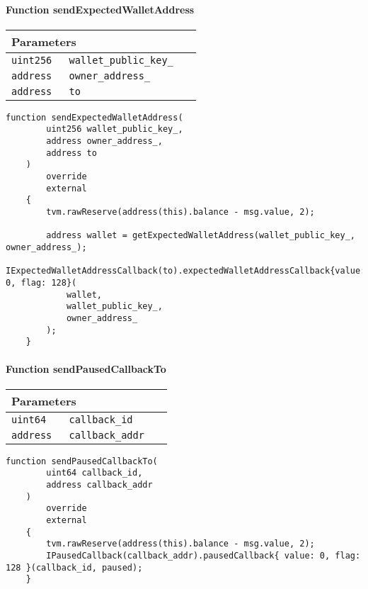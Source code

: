 \paragraph{Function sendExpectedWalletAddress}


\ifsoltables
\noindent\begin{tabular}{|l|l|p{5cm}|}\hline
\multicolumn{3}{|l|}{\bf Parameters}\\\hline
\tt uint256 & \tt wallet\_{}public\_{}key\_{} &\\\hline
\tt address & \tt owner\_{}address\_{} &\\\hline
\tt address & \tt to &\\\hline
\end{tabular}
\fi

\vspace{2cm}

\begin{lstlisting}[firstnumber=134]
    function sendExpectedWalletAddress(
        uint256 wallet_public_key_,
        address owner_address_,
        address to
    )
        override
        external
    {
        tvm.rawReserve(address(this).balance - msg.value, 2);

        address wallet = getExpectedWalletAddress(wallet_public_key_, owner_address_);
        IExpectedWalletAddressCallback(to).expectedWalletAddressCallback{value: 0, flag: 128}(
            wallet,
            wallet_public_key_,
            owner_address_
        );
    }
\end{lstlisting}

\paragraph{Function sendPausedCallbackTo}


\ifsoltables
\noindent\begin{tabular}{|l|l|p{5cm}|}\hline
\multicolumn{3}{|l|}{\bf Parameters}\\\hline
\tt uint64 & \tt callback\_{}id &\\\hline
\tt address & \tt callback\_{}addr &\\\hline
\end{tabular}
\fi

\vspace{2cm}

\begin{lstlisting}[firstnumber=423]
    function sendPausedCallbackTo(
        uint64 callback_id,
        address callback_addr
    )
        override
        external
    {
        tvm.rawReserve(address(this).balance - msg.value, 2);
        IPausedCallback(callback_addr).pausedCallback{ value: 0, flag: 128 }(callback_id, paused);
    }
\end{lstlisting}


